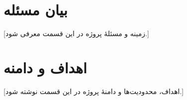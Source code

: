\section{بیان مسئله}
[زمینه و مسئلۀ پروژه در این قسمت معرفی شود.]

\section{اهداف و دامنه}
[اهداف، محدودیت‌ها و دامنۀ پروژه در این قسمت نوشته شود.]

